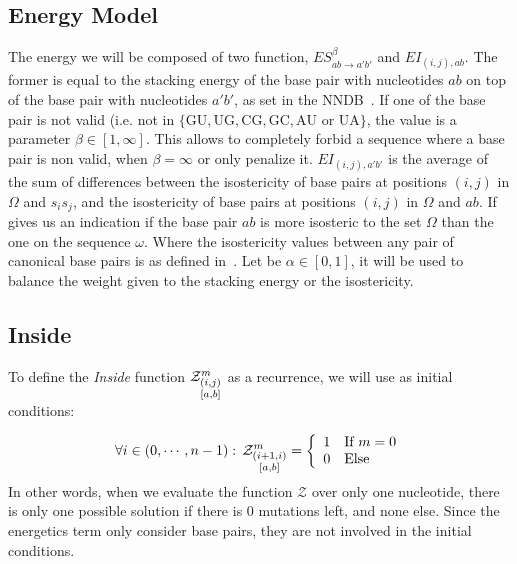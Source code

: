 \subsection{Energy Model}
The energy we will be composed of two function, $ES^{\beta}_{ab\to a'b'}$ and 
$EI_{(i,j),ab}$. The former is equal to the 
stacking energy of the base pair with nucleotides $ab$ on top of the base pair with nucleotides 
$a'b'$, as set in the NNDB~\cite{Turner2010}. If one of the base pair is not valid (i.e. not in 
$\{\text{GU},\text{UG},\text{CG},\text{GC}, \text{AU or UA}\}$, the value is a parameter 
$\beta \in [1,\infty]$. This allows
to completely forbid a sequence where a base pair is non valid, when $\beta = \infty$ or only 
penalize it.
$EI_{(i,j), a'b'}$ is the average of the sum of differences between the isostericity
of base pairs at positions $(i,j)$ in $\Omega$ and $s_is_j$, and the isostericity of base pairs
 at positions $(i,j)$ in $\Omega$ and $ab$. If gives us an indication 
 if the base pair $ab$ is more isosteric to the set $\Omega$ than the one on the sequence 
 $\omega$. Where the isostericity values 
 between any pair of canonical base pairs is  as defined in~\cite{Stombaugh2009}. 
 Let be $\alpha\in[0,1]$, it 
 will be used to balance the weight given to the stacking energy or the isostericity.
	
\subsection{Inside}
To define the \emph{Inside} function $\Z{i,j}{m}{a,b}$ as a recurrence, we will use as initial conditions:

\[
	\forall i \in (0,\cdots,n-1):\, \Z{i+1,i}{m}{a,b}=\left\{
	\begin{array}{ll}
		1 &\text{If } m = 0\\
		0 &\text{Else }
	\end{array}\right.
\]
In other words, when we evaluate the function $\mathcal Z$  over only one nucleotide, there 
is only one possible solution if there is $0$ mutations left, and none else. Since the 
energetics term only consider base pairs, they are not involved in the initial conditions. 

